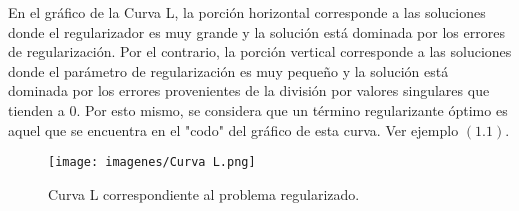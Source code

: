 \documentclass[12pt, oneside]{book}
\begin{document}
	En el gráfico de la Curva L, la porción horizontal corresponde a las soluciones donde el regularizador es muy grande y la solución está dominada por los errores de regularización. Por el contrario, la porción vertical corresponde a las soluciones donde el parámetro de regularización es muy pequeño y la solución está dominada por los errores provenientes de la división por valores singulares que tienden a 0. Por esto mismo, se considera que un término regularizante óptimo es aquel que se encuentra en el "codo" del gráfico de esta curva. Ver ejemplo $(1.1)$.
	\begin{figure}[H] 
		\centering 
		\texttt{[image: imagenes/Curva L.png]}
		\caption{Curva L correspondiente al problema regularizado.}
	\end{figure}
\end{document}
